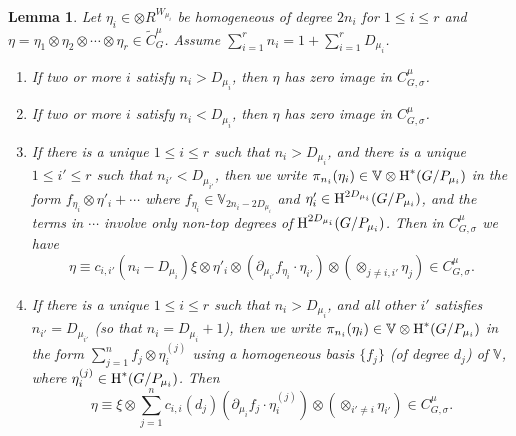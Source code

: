 \documentclass[reqno]{amsart}
\numberwithin{equation}{subsection}
\newtheorem{lemma}[subsubsection]{Lemma}
\theoremstyle{definition}
\def\VV{\mathbb{V}}
\newcommand{\Bun}{\textup{Bun}}
\newcommand\Sht{\textup{Sht}}
\newcommand{\wt}[1]{\widetilde{#1}}
\newcommand\ot{\otimes}
\newcommand{\cohog}[2]{\textup{H}^{#1}({#2})}     %
\newcommand{\s}{\sigma}
\newcommand{\y}{\eta}
\newcommand{\z}{\zeta}
\newcommand{\om}{\omega}
\newcommand\pl{\partial}
\begin{document}
\begin{lemma}\label{l:eta cases}
    Let $\y_i\in \ot R^{W_{\mu_i}}$ be homogeneous of degree $2n_i$ for $1\le i\le r$ and $\y=\y_1\ot\y_2\ot \cdots\ot \y_r\in \wt C^\mu_G$. Assume $\sum_{i=1}^rn_i=1+\sum_{i=1}^rD_{\mu_i}$.
    \begin{enumerate}
        \item If two or more $i$ satisfy $n_i>D_{\mu_i}$, then $\y$ has zero image in $C^\mu_{G,\s}$.
        \item If two or more $i$ satisfy $n_i<D_{\mu_i}$, then $\y$ has zero image in $C^\mu_{G,\s}$.
        \item If there is a unique $1\le i\le r$ such that $n_i>D_{\mu_i}$, and there is a unique $1\le i'\le r$ such that $n_{i'}<D_{\mu_{i'}}$, then we write $\pi_{n_i}(\y_i)\in \VV\ot \cohog{*}{G/P_{\mu_i}}$ in the form $f_{\y_i}\ot \y'_i+\cdots$ where $f_{\y_i}\in \VV_{2n_i-2D_{\mu_i}}$ and $\y'_i\in \cohog{2D_{\mu_i}}{G/P_{\mu_i}}$, and the terms in $\cdots$ involve only non-top degrees of $\cohog{2D_{\mu_i}}{G/P_{\mu_i}}$. Then in $C^\mu_{G,\s}$ we have
        \begin{equation*}
            \y\equiv c_{i,i'}(n_i-D_{\mu_i})\xi\ot\y'_i\ot (\pl_{\mu_{i'}}f_{\y_i}\cdot \y_{i'})\ot(\ot_{j\ne i,i'}\y_j) \in C^\mu_{G,\s}.
        \end{equation*}
        \item If there is a unique $1\le i\le r$ such that $n_i>D_{\mu_i}$, and all other $i'$ satisfies $n_{i'}=D_{\mu_{i'}}$ (so that $n_i=D_{\mu_i}+1$), then we write $\pi_{n_i}(\y_i)\in \VV\ot \cohog{*}{G/P_{\mu_i}}$ in the form $\sum_{j=1}^nf_j\ot \y^{(j)}_{i}$ using a homogeneous basis $\{f_j\}$ (of degree $d_j$) of $\VV$, where $\y^{(j)}_{i}\in \cohog{*}{G/P_{\mu_i}}$. Then
        \begin{equation*}
            \y\equiv \xi\ot\sum_{j=1}^nc_{i,i}(d_j)  (\pl_{\mu_{i}}f_{j}\cdot \y^{(j)}_{i})\ot(\ot_{i'\ne i}\y_{i'}) \in C^\mu_{G,\s}.
        \end{equation*}
        
    \end{enumerate}
\end{lemma}
\end{document}
